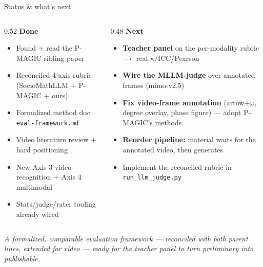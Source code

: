 \documentclass[aspectratio=169,10pt]{beamer}
\newcommand{\ok}{{\color{cApp}\textbf{\checkmark}}}
\begin{document}
\begin{frame}{Status \& what's next}
\small
\begin{columns}[T]
\begin{column}{0.52\textwidth}
\textbf{\color{cApp}Done}
\begin{itemize}\setlength\itemsep{1pt}\small
  \item Found $+$ read the P-MAGIC sibling paper \ok
  \item Reconciled 4-axis rubric (SocioMathLLM $+$ P-MAGIC $+$ ours) \ok
  \item Formalized method doc \texttt{eval-framework.md} \ok
  \item Video literature review $+$ hard positioning \ok
  \item New Axis 3 video-recognition $+$ Axis 4 multimodal \ok
  \item Stats/judge/rater tooling already wired \ok
\end{itemize}
\end{column}
\begin{column}{0.48\textwidth}
\textbf{\color{cAccent}Next}
\begin{itemize}\setlength\itemsep{1pt}\small
  \item \textbf{Teacher panel} on the per-modality rubric $\to$ real $\kappa$/ICC/Pearson
  \item \textbf{Wire the MLLM-judge} over annotated frames (mimo-v2.5)
  \item \textbf{Fix video-frame annotation} (arrow$+\omega$, degree overlay, phase figure) --- adopt P-MAGIC's methods
  \item \textbf{Reorder pipeline:} material waits for the annotated video, then generates
  \item Implement the reconciled rubric in \texttt{run\_llm\_judge.py}
\end{itemize}
\end{column}
\end{columns}
\vspace{0.5em}
\begin{center}
{\footnotesize\itshape A formalized, comparable evaluation framework --- reconciled with both parent
lines, extended for video --- ready for the teacher panel to turn preliminary into publishable.}
\end{center}
\end{frame}
\end{document}
